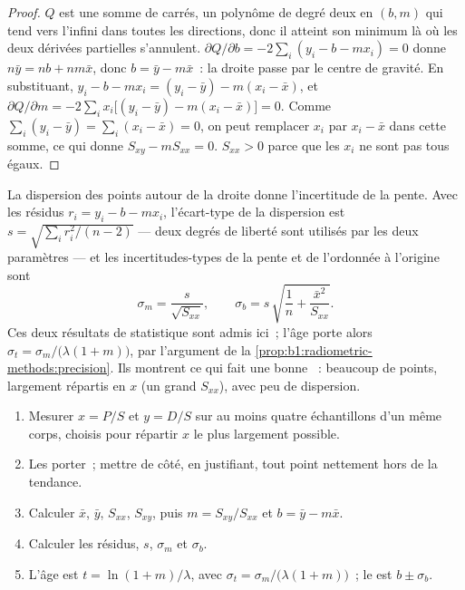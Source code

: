 \begin{proof}
$Q$ est une somme de carrés, un polynôme de degré deux en $(b, m)$ qui tend vers
l'infini dans toutes les directions, donc il atteint son minimum là où les deux dérivées
partielles s'annulent. $\partial Q/\partial b = -2 \sum_i (y_i - b - m x_i) = 0$
donne $n\bar y = n b + n m \bar x$, donc $b = \bar y - m \bar x$~: la droite passe
par le centre de gravité. En substituant, $y_i - b - m x_i = (y_i - \bar y) - m(x_i -
\bar x)$, et $\partial Q/\partial m = -2 \sum_i x_i \bigl[(y_i - \bar y) - m(x_i
- \bar x)\bigr] = 0$. Comme $\sum_i (y_i - \bar y) = \sum_i (x_i - \bar x) = 0$, on peut
remplacer $x_i$ par $x_i - \bar x$ dans cette somme, ce qui donne $S_{xy} - m S_{xx} = 0$.
$S_{xx} > 0$ parce que les $x_i$ ne sont pas tous égaux.
\end{proof}

La dispersion des points autour de la droite donne l'incertitude de la pente.
Avec les résidus $r_i = y_i - b - m x_i$, l'écart-type de la
dispersion est $s = \sqrt{\sum_i r_i^2/(n-2)}$ --- deux degrés de liberté sont utilisés
par les deux paramètres --- et les incertitudes-types de la pente et de
l'ordonnée à l'origine sont
\[
  \sigma_m = \frac{s}{\sqrt{S_{xx}}}, \qquad
  \sigma_b = s\,\sqrt{\frac1n + \frac{\bar x^2}{S_{xx}}} .
\]
Ces deux résultats de statistique sont admis ici~; l'âge porte alors
$\sigma_t = \sigma_m/\bigl(\lambda(1 + m)\bigr)$, par l'argument de la
\cref{prop:b1:radiometric-methods:precision}. Ils montrent ce qui fait une bonne
~: beaucoup de points, largement répartis en $x$ (un grand $S_{xx}$), avec peu de
dispersion.

\begin{method}\label{met:b1:radiometric-methods:isochron}
\begin{enumerate}
  \item Mesurer $x = P/S$ et $y = D/S$ sur au moins quatre échantillons d'un même corps,
        choisis pour répartir $x$ le plus largement possible.
  \item Les porter~; mettre de côté, en justifiant, tout point nettement hors de la tendance.
  \item Calculer $\bar x$, $\bar y$, $S_{xx}$, $S_{xy}$, puis $m = S_{xy}/S_{xx}$
        et $b = \bar y - m \bar x$.
  \item Calculer les résidus, $s$, $\sigma_m$ et $\sigma_b$.
  \item L'âge est $t = \ln(1+m)/\lambda$, avec $\sigma_t =
        \sigma_m/\bigl(\lambda(1+m)\bigr)$~; le  est $b \pm \sigma_b$.
\end{enumerate}
\end{method}


